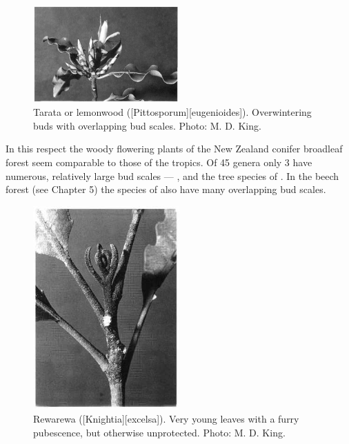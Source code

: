 \begin{figure}
	\includegraphics[width=0.5\textwidth]{graphics/figure24tarata.jpg}
	\centering
	\caption[Tarata or lemonwood]{Tarata or lemonwood ([Pittosporum][eugenioides]). Overwintering buds with overlapping bud scales. Photo: M. D. King.}%
	\label{fig:24tarata}
\end{figure}

In this respect the woody flowering plants of the New Zealand conifer broadleaf forest seem comparable to those of the tropics.
Of 45 genera only 3 have numerous, relatively large bud scales --- ,  and the tree species of .
In the beech forest (see Chapter 5) the species of  also have many overlapping bud scales.

\begin{figure}
	\includegraphics[width=0.5\textwidth]{graphics/figure25rewarewa.jpg}
	\centering
	\caption[Rewarewa leaves]{Rewarewa ([Knightia][excelsa]).
	Very young leaves with a furry pubescence, but otherwise unprotected.
	Photo: M. D. King.}%
	\label{fig:25rewarewa}
\end{figure}

